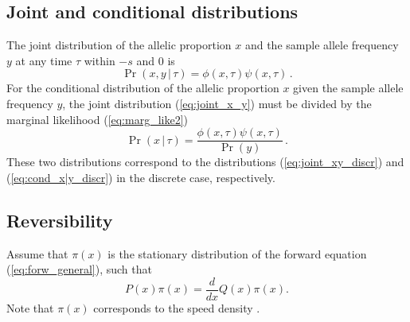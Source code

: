\documentclass[preprint]{elsarticle}
\newcommand\given{{\,|\,}}
\begin{document}
\subsection{Joint and conditional distributions}

The joint distribution of the allelic proportion $x$ and the sample allele frequency $y$ at any time $\tau$ within $-s$ and $0$ is
\begin{equation}\label{eq:joint_x_y}
\Pr(x,y \given \tau)= \phi(x, \tau)\psi(x,\tau)\,.
\end{equation}
For the conditional distribution of the allelic proportion $x$ given the sample allele frequency $y$, the joint distribution (\ref{eq:joint_x_y}) must be divided by the marginal likelihood (\ref{eq:marg_like2})
\begin{equation}\label{eq:cond_x|y}
\Pr(x\given \tau)= \frac{\phi(x, \tau)\psi(x,\tau)}{\Pr(y)}\,.
\end{equation}
These two distributions correspond to the distributions (\ref{eq:joint_xy_discr}) and (\ref{eq:cond_x|y_discr}) in the discrete case, respectively. 

\subsection{Reversibility}

Assume that $\pi(x)$ is the stationary distribution of the forward equation (\ref{eq:forw_general}), such that 
\begin{equation}
P(x)\pi(x)=\frac{d}{d x}Q(x)\pi(x).
\end{equation}
Note that $\pi(x)$ corresponds to the speed density \citep{Ewen04,Song12}. 
\end{document}
